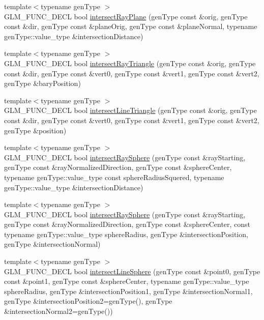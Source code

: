\begin{DoxyCompactItemize}
\item 
{\footnotesize template$<$typename gen\-Type $>$ }\\G\-L\-M\-\_\-\-F\-U\-N\-C\-\_\-\-D\-E\-C\-L bool \hyperlink{group__gtx__intersect_gad3697a9700ea379739a667ea02573488}{intersect\-Ray\-Plane} (gen\-Type const \&orig, gen\-Type const \&dir, gen\-Type const \&plane\-Orig, gen\-Type const \&plane\-Normal, typename gen\-Type\-::value\-\_\-type \&intersection\-Distance)
\item 
{\footnotesize template$<$typename gen\-Type $>$ }\\G\-L\-M\-\_\-\-F\-U\-N\-C\-\_\-\-D\-E\-C\-L bool \hyperlink{group__gtx__intersect_gab16c1b47c10451e7604b51b39a7ef21d}{intersect\-Ray\-Triangle} (gen\-Type const \&orig, gen\-Type const \&dir, gen\-Type const \&vert0, gen\-Type const \&vert1, gen\-Type const \&vert2, gen\-Type \&bary\-Position)
\item 
{\footnotesize template$<$typename gen\-Type $>$ }\\G\-L\-M\-\_\-\-F\-U\-N\-C\-\_\-\-D\-E\-C\-L bool \hyperlink{group__gtx__intersect_ga9d29b9b3acb504d43986502f42740df4}{intersect\-Line\-Triangle} (gen\-Type const \&orig, gen\-Type const \&dir, gen\-Type const \&vert0, gen\-Type const \&vert1, gen\-Type const \&vert2, gen\-Type \&position)
\item 
{\footnotesize template$<$typename gen\-Type $>$ }\\G\-L\-M\-\_\-\-F\-U\-N\-C\-\_\-\-D\-E\-C\-L bool \hyperlink{group__gtx__intersect_gac88f8cd84c4bcb5b947d56acbbcfa56e}{intersect\-Ray\-Sphere} (gen\-Type const \&ray\-Starting, gen\-Type const \&ray\-Normalized\-Direction, gen\-Type const \&sphere\-Center, typename gen\-Type\-::value\-\_\-type const sphere\-Radius\-Squered, typename gen\-Type\-::value\-\_\-type \&intersection\-Distance)
\item 
{\footnotesize template$<$typename gen\-Type $>$ }\\G\-L\-M\-\_\-\-F\-U\-N\-C\-\_\-\-D\-E\-C\-L bool \hyperlink{group__gtx__intersect_gad28c00515b823b579c608aafa1100c1d}{intersect\-Ray\-Sphere} (gen\-Type const \&ray\-Starting, gen\-Type const \&ray\-Normalized\-Direction, gen\-Type const \&sphere\-Center, const typename gen\-Type\-::value\-\_\-type sphere\-Radius, gen\-Type \&intersection\-Position, gen\-Type \&intersection\-Normal)
\item 
{\footnotesize template$<$typename gen\-Type $>$ }\\G\-L\-M\-\_\-\-F\-U\-N\-C\-\_\-\-D\-E\-C\-L bool \hyperlink{group__gtx__intersect_ga9c68139f3d8a4f3d7fe45f9dbc0de5b7}{intersect\-Line\-Sphere} (gen\-Type const \&point0, gen\-Type const \&point1, gen\-Type const \&sphere\-Center, typename gen\-Type\-::value\-\_\-type sphere\-Radius, gen\-Type \&intersection\-Position1, gen\-Type \&intersection\-Normal1, gen\-Type \&intersection\-Position2=gen\-Type(), gen\-Type \&intersection\-Normal2=gen\-Type())

\end{DoxyCompactItemize}
